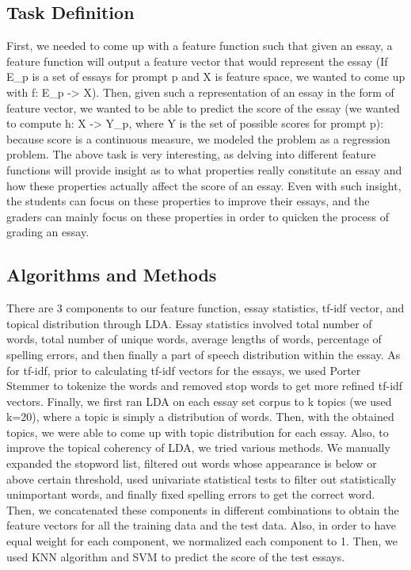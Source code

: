 \documentclass{article}
\begin{document}
\subsection{Task Definition}
First, we needed to come up with a feature function such that given an essay, a feature function will output a feature vector that would represent the essay (If E_p is a set of essays for prompt p and X is feature space, we wanted to come up with f: E_p -> X). Then, given such a representation of an essay in the form of feature vector, we wanted to be able to predict the score of the essay (we wanted to compute h: X -> Y_p, where Y is the set of possible scores for prompt p): because score is a continuous measure, we modeled the problem as a regression problem.
The above task is very interesting, as delving into different feature functions will provide insight as to what properties really constitute an essay and how these properties actually affect the score of an essay. Even with such insight, the students can focus on these properties to improve their essays, and the graders can mainly focus on these properties in order to quicken the process of grading an essay.

\subsection{Algorithms and Methods}
There are 3 components to our feature function, essay statistics, tf-idf vector, and topical distribution through LDA. Essay statistics involved total number of words, total number of unique words, average lengths of words, percentage of spelling errors, and then finally a part of speech distribution within the essay. As for tf-idf, prior to calculating tf-idf vectors for the essays, we used Porter Stemmer to tokenize the words and removed stop words to get more refined tf-idf vectors. Finally, we first ran LDA on each essay set corpus to k topics (we used k=20), where a topic is simply a distribution of words. Then, with the obtained topics, we were able to come up with topic distribution for each essay.
Also, to improve the topical coherency of LDA, we tried various methods. We manually expanded the stopword list, filtered out words whose appearance is below or above certain threshold, used univariate statistical tests to filter out statistically unimportant words, and finally fixed spelling errors to get the correct word.
Then, we concatenated these components in different combinations to obtain the feature vectors for all the training data and the test data. Also, in order to have equal weight for each component, we normalized each component to 1. Then, we used KNN algorithm and SVM to predict the score of the test essays. 
\end{document}

